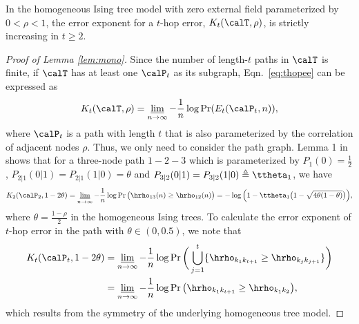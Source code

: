 \documentclass[11pt,onecolumn]{article}
\begin{document}
\begin{lemma}\label{lem:mono}
	In the homogeneous Ising tree model with zero external field parameterized by $0<\rho<1$, the error exponent for a $t$-hop error, $K _{t}(\calT,\rho)$, is strictly increasing in $t\geq 2$.
\end{lemma}
\begin{proof}[Proof of Lemma \ref{lem:mono}]
	Since the number of length-$t$ paths in $\calT$ is finite, if $\calT$ has at least one $\calP_{t}$ as its subgraph, Eqn.~\eqref{eq:thopee} can be expressed as
	\begin{align}
		K _{t}(\calT,\rho)=\varliminf_{n\rightarrow \infty}-\frac{1}{n}\log\Pr (E_{t}(\calP_{t},n)),
	\end{align}
	where $\calP_{t}$ is a path with length $t$ that is also parameterized by the correlation of adjacent nodes $\rho$. Thus, we only need to consider the path graph. Lemma 1 in \cite{tandon2020exact} shows that for a three-node path $1-2-3$ which is parameterized by $P_{1}(0)=\frac{1}{2}$, $P_{2|1}(0|1)=P_{2|1}(1|0)=\theta$ 
	and $P_{3|2}(0|1)=P_{3|2}(1|0)\triangleq\ttheta_{1}$, we have
	\begin{align}
		K_{2}(\calP_{2},1-2\theta)=\varliminf_{n\rightarrow \infty}-\frac{1}{n}\log\Pr\big(\hrho_{13}(n)\geq\hrho_{12}(n)\big) 
		=-\log\Big(1-\ttheta_{1}\big(1-\sqrt{4\theta(1-\theta)}\big)\Big),
	\end{align}
	where $\theta=\frac{1-\rho}{2}$ in the homogeneous Ising trees. To calculate the error exponent of $t$-hop error in the path with $\theta\in (0,0.5)$, we note that
	\begin{align}
		K _{t}(\calP_{t},1-2\theta)&=\varliminf_{n\rightarrow \infty}-\frac{1}{n}\log\Pr\bigg(\bigcup_{j=1}^{t}\{\hrho_{k_{1}k_{t+1}}\geq \hrho_{k_{j}k_{j+1}}\}\bigg)\\*
		&=\varliminf_{n\rightarrow \infty}-\frac{1}{n}\log\Pr\big(\hrho_{k_{1}k_{t+1}}\geq \hrho_{k_{1}k_{2}}\big),
	\end{align}
	which results from the symmetry of the underlying homogeneous tree model.


\end{proof}
\end{document}
